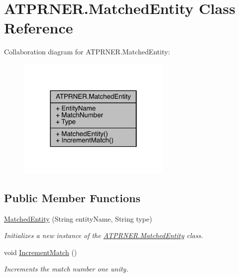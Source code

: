 \hypertarget{class_a_t_p_r_n_e_r_1_1_matched_entity}{}\section{A\+T\+P\+R\+N\+E\+R.\+Matched\+Entity Class Reference}
\label{class_a_t_p_r_n_e_r_1_1_matched_entity}


Collaboration diagram for A\+T\+P\+R\+N\+E\+R.\+Matched\+Entity\+:
\nopagebreak
\begin{figure}[H]
\begin{center}
\leavevmode
\includegraphics[width=209pt]{d6/dd7/class_a_t_p_r_n_e_r_1_1_matched_entity__coll__graph}
\end{center}
\end{figure}
\subsection*{Public Member Functions}
\begin{DoxyCompactItemize}
\item 
\hyperlink{class_a_t_p_r_n_e_r_1_1_matched_entity_a5737ccd3008395ca92559e0b1b1f3e73}{Matched\+Entity} (String entity\+Name, String type)
\begin{DoxyCompactList}\small\item\em Initializes a new instance of the \hyperlink{class_a_t_p_r_n_e_r_1_1_matched_entity}{A\+T\+P\+R\+N\+E\+R.\+Matched\+Entity} class. \end{DoxyCompactList}\item 
void \hyperlink{class_a_t_p_r_n_e_r_1_1_matched_entity_ae6fa09ea42c0787d4279ceb5076c5f14}{Increment\+Match} ()
\begin{DoxyCompactList}\small\item\em Increments the match number one unity. \end{DoxyCompactList}\end{DoxyCompactItemize}
